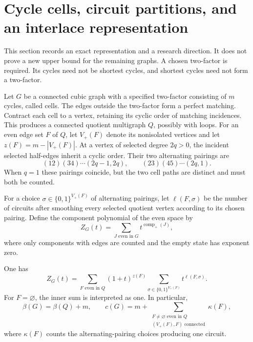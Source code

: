 \section{Cycle cells, circuit partitions, and an interlace representation}
\label{sec:random-cycle-quotient}

This section records an exact representation and a research direction.
It does not prove a new upper bound for the remaining graphs.
A chosen two-factor is required.
Its cycles need not be shortest cycles, and shortest cycles need not form a two-factor.

Let $G$ be a connected cubic graph with a specified two-factor consisting of $m$ cycles, called cells.
The edges outside the two-factor form a perfect matching.
Contract each cell to a vertex, retaining its cyclic order of matching incidences.
This produces a connected quotient multigraph $Q$, possibly with loops.
For an even edge set $F$ of $Q$, let $V_+(F)$ denote its nonisolated vertices and let $z(F)=m-|V_+(F)|$.
At a vertex of selected degree $2q>0$, the incident selected half-edges inherit a cyclic order.
Their two alternating pairings are
\[
 (12)(34)\cdots(2q-1,2q),
 \qquad
 (23)(45)\cdots(2q,1).
\]
When $q=1$ these pairings coincide, but the two cell paths are distinct and must both be counted.

For a choice $\sigma\in\{0,1\}^{V_+(F)}$ of alternating pairings, let
$\ell(F,\sigma)$ be the number of circuits after smoothing every selected quotient vertex according to its chosen pairing.
Define the component polynomial of the even space by
\[
 Z_G(t)=\sum_{J\text{ even in }G}t^{\operatorname{comp}_+(J)},
\]
where only components with edges are counted and the empty state has exponent zero.

\begin{proposition}
\label{prop:random-cycle-cell-expansion}
One has
\[
 Z_G(t)=
 \sum_{F\text{ even in }Q}
 (1+t)^{z(F)}
 \sum_{\sigma\in\{0,1\}^{V_+(F)}}t^{\ell(F,\sigma)}.
\]
For $F=\varnothing$, the inner sum is interpreted as one.
In particular,
\[
 \beta(G)=\beta(Q)+m,
 \qquad
 c(G)=m+
 \sum_{\substack{F\ne\varnothing\text{ even in }Q\\
                 (V_+(F),F)\text{ connected}}}\kappa(F),
\]
where $\kappa(F)$ counts the alternating-pairing choices producing one circuit.
\end{proposition}

